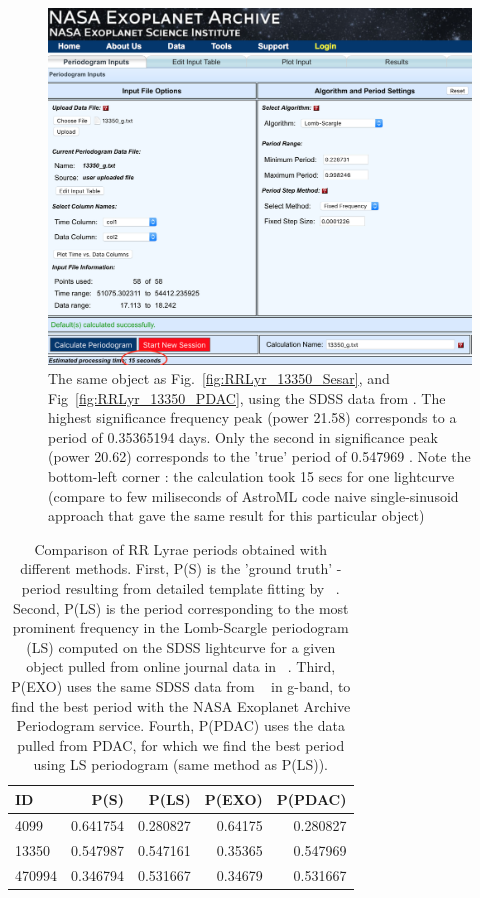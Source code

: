 \documentclass[fleqn,usenatbib]{mnras} %
\begin{document}
\begin{figure}
\includegraphics[width=\textwidth]{figs/Exoplanet_archive_periodogram}
\caption{ The same object as Fig.~\ref{fig:RRLyr_13350_Sesar}, and Fig~\ref{fig:RRLyr_13350_PDAC},  using  the SDSS data from \citep{sesar2010}.  The highest significance frequency peak (power 21.58) corresponds to  a period of 0.35365194 days. Only the second in significance peak (power 20.62) corresponds to the 'true' period of 0.547969 \citep{sesar2010}. Note the bottom-left corner : the calculation took 15 secs for one lightcurve (compare to few miliseconds of AstroML code naive single-sinusoid approach that gave the same result for this particular object) }
\label{fig:exoplanet_archive}
\end{figure}



\begin{table}
\centering
\caption{Comparison of RR Lyrae periods obtained with different methods. First, P(S) is the 'ground truth' -  period resulting from detailed template fitting by ~\citep{sesar2010}. Second, P(LS) is the period corresponding to the most prominent frequency in the Lomb-Scargle periodogram  (LS) computed on the SDSS lightcurve for a given object pulled from online journal data in ~\citep{sesar2010}. Third, P(EXO) uses the same SDSS data from ~\citep{sesar2010} in g-band, to find the best period with the NASA Exoplanet Archive Periodogram service.  Fourth, P(PDAC) uses the data pulled from PDAC, for which we find  the best period using  LS periodogram (same method as P(LS)).}
\label{tab:periods}
\begin{tabular}{ l|rrrr } 
\hline
 ID      & P(S)         & P(LS)      & P(EXO)       & P(PDAC) \\ 
\hline
 4099    & 0.641754     & 0.280827   & 0.64175      &  0.280827 \\ 
 13350   & 0.547987     & 0.547161   & 0.35365      &  0.547969  \\ 
 470994  & 0.346794     & 0.531667   & 0.34679      &  0.531667  \\ 
\end{tabular}
\end{table}
\end{document}
